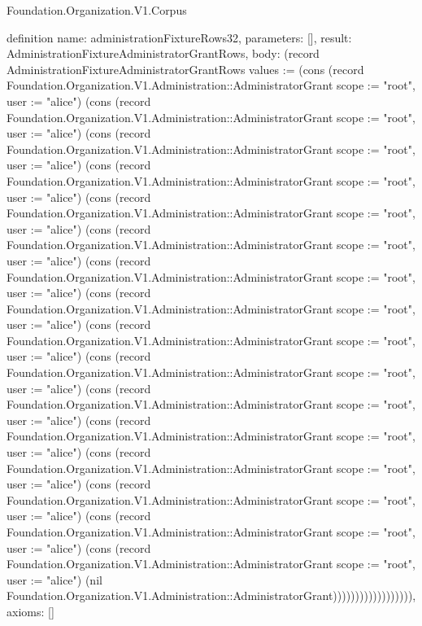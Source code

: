 \begin{lexlean}{Foundation.Organization.V1.Corpus}
\begin{semanticmodule}
definition{
  name: administrationFixtureRows32,
  parameters: [],
  result: AdministrationFixtureAdministratorGrantRows,
  body: (record AdministrationFixtureAdministratorGrantRows {values := (cons (record Foundation.Organization.V1.Administration::AdministratorGrant {scope := "root", user := "alice"}) (cons (record Foundation.Organization.V1.Administration::AdministratorGrant {scope := "root", user := "alice"}) (cons (record Foundation.Organization.V1.Administration::AdministratorGrant {scope := "root", user := "alice"}) (cons (record Foundation.Organization.V1.Administration::AdministratorGrant {scope := "root", user := "alice"}) (cons (record Foundation.Organization.V1.Administration::AdministratorGrant {scope := "root", user := "alice"}) (cons (record Foundation.Organization.V1.Administration::AdministratorGrant {scope := "root", user := "alice"}) (cons (record Foundation.Organization.V1.Administration::AdministratorGrant {scope := "root", user := "alice"}) (cons (record Foundation.Organization.V1.Administration::AdministratorGrant {scope := "root", user := "alice"}) (cons (record Foundation.Organization.V1.Administration::AdministratorGrant {scope := "root", user := "alice"}) (cons (record Foundation.Organization.V1.Administration::AdministratorGrant {scope := "root", user := "alice"}) (cons (record Foundation.Organization.V1.Administration::AdministratorGrant {scope := "root", user := "alice"}) (cons (record Foundation.Organization.V1.Administration::AdministratorGrant {scope := "root", user := "alice"}) (cons (record Foundation.Organization.V1.Administration::AdministratorGrant {scope := "root", user := "alice"}) (cons (record Foundation.Organization.V1.Administration::AdministratorGrant {scope := "root", user := "alice"}) (cons (record Foundation.Organization.V1.Administration::AdministratorGrant {scope := "root", user := "alice"}) (cons (record Foundation.Organization.V1.Administration::AdministratorGrant {scope := "root", user := "alice"}) (nil Foundation.Organization.V1.Administration::AdministratorGrant)))))))))))))))))}),
  axioms: []
}


\end{semanticmodule}
\end{lexlean}
